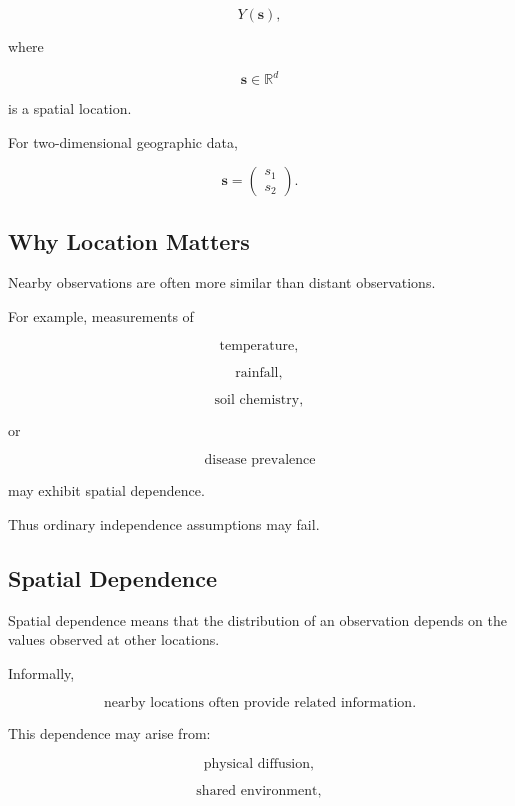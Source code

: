 \[
\boxed{
Y(\mathbf{s}),
}
\]

where

\[
\mathbf{s}
\in
\mathbb{R}^d
\]

is a spatial location.

For two-dimensional geographic data,

\[
\boxed{
\mathbf{s}
=
\begin{pmatrix}
s_1\\
s_2
\end{pmatrix}.
}
\]

\subsection{Why Location Matters}
\label{subsec:why-location-matters}

Nearby observations are often more similar than distant observations.

For example, measurements of

\[
\boxed{
\text{temperature},
}
\]

\[
\boxed{
\text{rainfall},
}
\]

\[
\boxed{
\text{soil chemistry},
}
\]

or

\[
\boxed{
\text{disease prevalence}
}
\]

may exhibit spatial dependence.

Thus ordinary independence assumptions may fail.

\subsection{Spatial Dependence}
\label{subsec:spatial-dependence}

Spatial dependence means that the distribution of an observation depends
on the values observed at other locations.

Informally,

\[
\boxed{
\text{nearby locations often provide related information}.
}
\]

This dependence may arise from:

\[
\boxed{
\text{physical diffusion},
}
\]

\[
\boxed{
\text{shared environment},
}
\]

